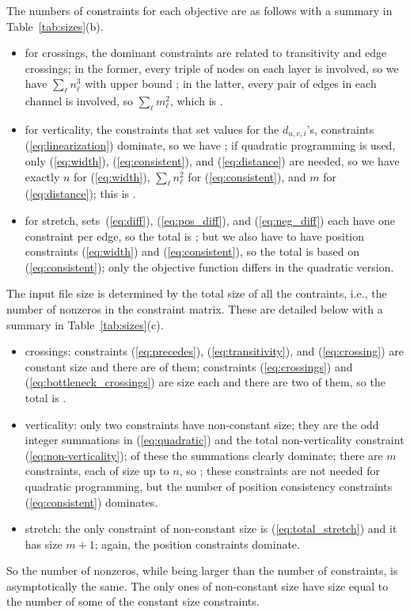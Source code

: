 The numbers of constraints for each objective are as follows with a summary in Table~\ref{tab:sizes}(b).
\begin{itemize}
  \item for crossings, the dominant constraints are related to transitivity and edge crossings; in the former, every triple of nodes on each layer is involved, so we have $\sum_{\ell} n_{\ell}^3$ with upper bound ; in the latter, every pair of edges in each channel is involved, so $\sum_{\ell} m_{\ell}^2$, which is .
  \item for verticality, the constraints that set values for the $d_{u,v,i}$'s, constraints (\ref{eq:linearization}) dominate, so we have ; if quadratic programming is used, only (\ref{eq:width}), (\ref{eq:consistent}), and (\ref{eq:distance}) are needed, so we have exactly $n$ for (\ref{eq:width}), $\sum_{\ell} n_{\ell}^2$ for (\ref{eq:consistent}), and $m$ for (\ref{eq:distance}); this is .
  \item for stretch, sets~(\ref{eq:diff}), (\ref{eq:pos_diff}), and (\ref{eq:neg_diff}) each have one constraint per edge, so the total is ; but we also have to have position constraints (\ref{eq:width}) and (\ref{eq:consistent}), so the total is  based on (\ref{eq:consistent}); only the objective function differs in the quadratic version.
\end{itemize}

The input file size is determined by the total size of all the contraints, i.e., the number of nonzeros in the constraint matrix. These are detailed below with a summary in Table~\ref{tab:sizes}(c).
\begin{itemize}
  \item crossings: constraints (\ref{eq:precedes}), (\ref{eq:transitivity}), and (\ref{eq:crossing}) are constant size and there are  of them; constraints (\ref{eq:crossings}) and (\ref{eq:bottleneck_crossings}) are size  each and there are two of them, so the total is .
  \item verticality: only two constraints have non-constant size; they are the odd integer summations in (\ref{eq:quadratic}) and the total non-verticality constraint (\ref{eq:non-verticality}); of these the summations clearly dominate; there are $m$ constraints, each of size up to $n$, so ; these constraints are not needed for quadratic programming, but the number of position consistency constraints (\ref{eq:consistent}) dominates.
  \item stretch: the only constraint of non-constant size is (\ref{eq:total_stretch}) and it has size $m+1$; again, the position constraints dominate.
\end{itemize}
So the number of nonzeros, while being larger than the number of constraints, is asymptotically the same. The only ones of non-constant size have size equal to the number of some of the constant size constraints.

